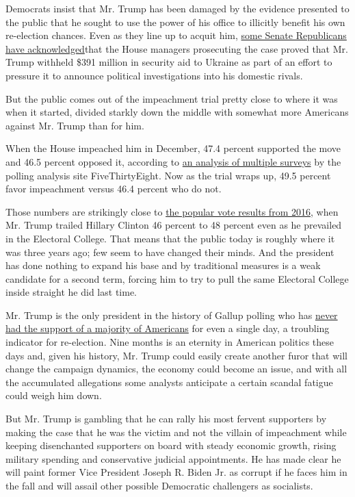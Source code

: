 Democrats insist that Mr. Trump has been damaged by the evidence
presented to the public that he sought to use the power of his office to
illicitly benefit his own re-election chances. Even as they line up to
acquit him,
\href{https://www.nytimes.com/2020/01/31/us/politics/republican-response-impeachment.html}{some
Senate Republicans have acknowledged}that the House managers prosecuting
the case proved that Mr. Trump withheld \$391 million in security aid to
Ukraine as part of an effort to pressure it to announce political
investigations into his domestic rivals.

But the public comes out of the impeachment trial pretty close to where
it was when it started, divided starkly down the middle with somewhat
more Americans against Mr. Trump than for him.

When the House impeached him in December, 47.4 percent supported the
move and 46.5 percent opposed it, according to
\href{https://projects.fivethirtyeight.com/impeachment-polls/}{an
analysis of multiple surveys} by the polling analysis site
FiveThirtyEight. Now as the trial wraps up, 49.5 percent favor
impeachment versus 46.4 percent who do not.

Those numbers are strikingly close to
\href{https://www.nytimes.com/elections/2016/results/president}{the
popular vote results from 2016}, when Mr. Trump trailed Hillary Clinton
46 percent to 48 percent even as he prevailed in the Electoral College.
That means that the public today is roughly where it was three years
ago; few seem to have changed their minds. And the president has done
nothing to expand his base and by traditional measures is a weak
candidate for a second term, forcing him to try to pull the same
Electoral College inside straight he did last time.

Mr. Trump is the only president in the history of Gallup polling who has
\href{https://news.gallup.com/poll/203207/trump-job-approval-weekly.aspx}{never
had the support of a majority of Americans} for even a single day, a
troubling indicator for re-election. Nine months is an eternity in
American politics these days and, given his history, Mr. Trump could
easily create another furor that will change the campaign dynamics, the
economy could become an issue, and with all the accumulated allegations
some analysts anticipate a certain scandal fatigue could weigh him down.

But Mr. Trump is gambling that he can rally his most fervent supporters
by making the case that he was the victim and not the villain of
impeachment while keeping disenchanted supporters on board with steady
economic growth, rising military spending and conservative judicial
appointments. He has made clear he will paint former Vice President
Joseph R. Biden Jr. as corrupt if he faces him in the fall and will
assail other possible Democratic challengers as socialists.

